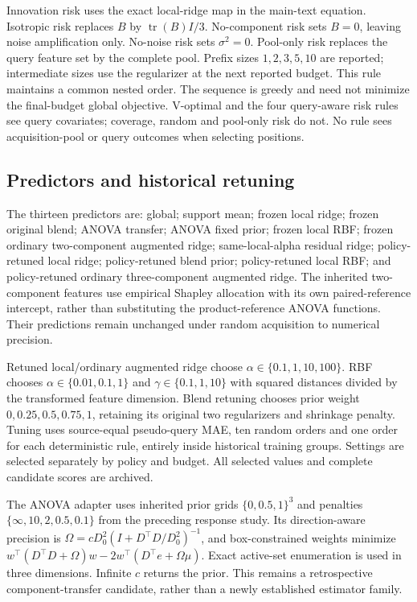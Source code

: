 \documentclass[11pt]{article}
\begin{document}
Innovation risk uses the exact local-ridge map in the main-text equation. Isotropic risk replaces $B$ by $\operatorname{tr}(B)I/3$. No-component risk sets $B=0$, leaving noise amplification only. No-noise risk sets $\sigma^2=0$. Pool-only risk replaces the query feature set by the complete pool. Prefix sizes $1,2,3,5,10$ are reported; intermediate sizes use the regularizer at the next reported budget. This rule maintains a common nested order. The sequence is greedy and need not minimize the final-budget global objective. V-optimal and the four query-aware risk rules see query covariates; coverage, random and pool-only risk do not. No rule sees acquisition-pool or query outcomes when selecting positions.

\subsection{Predictors and historical retuning}
The thirteen predictors are: global; support mean; frozen local ridge; frozen original blend; ANOVA transfer; ANOVA fixed prior; frozen local RBF; frozen ordinary two-component augmented ridge; same-local-alpha residual ridge; policy-retuned local ridge; policy-retuned blend prior; policy-retuned local RBF; and policy-retuned ordinary three-component augmented ridge. The inherited two-component features use empirical Shapley allocation with its own paired-reference intercept, rather than substituting the product-reference ANOVA functions. Their predictions remain unchanged under random acquisition to numerical precision.

Retuned local/ordinary augmented ridge choose $\alpha\in\{0.1,1,10,100\}$. RBF chooses $\alpha\in\{0.01,0.1,1\}$ and $\gamma\in\{0.1,1,10\}$ with squared distances divided by the transformed feature dimension. Blend retuning chooses prior weight $0,0.25,0.5,0.75,1$, retaining its original two regularizers and shrinkage penalty. Tuning uses source-equal pseudo-query MAE, ten random orders and one order for each deterministic rule, entirely inside historical training groups. Settings are selected separately by policy and budget. All selected values and complete candidate scores are archived.

The ANOVA adapter uses inherited prior grids $\{0,0.5,1\}^3$ and penalties $\{\infty,10,2,0.5,0.1\}$ from the preceding response study. Its direction-aware precision is $\Omega=cD_0^2(I+D^\top D/D_0^2)^{-1}$, and box-constrained weights minimize $w^\top(D^\top D+\Omega)w-2w^\top(D^\top e+\Omega\mu)$. Exact active-set enumeration is used in three dimensions. Infinite $c$ returns the prior. This remains a retrospective component-transfer candidate, rather than a newly established estimator family.
\end{document}
